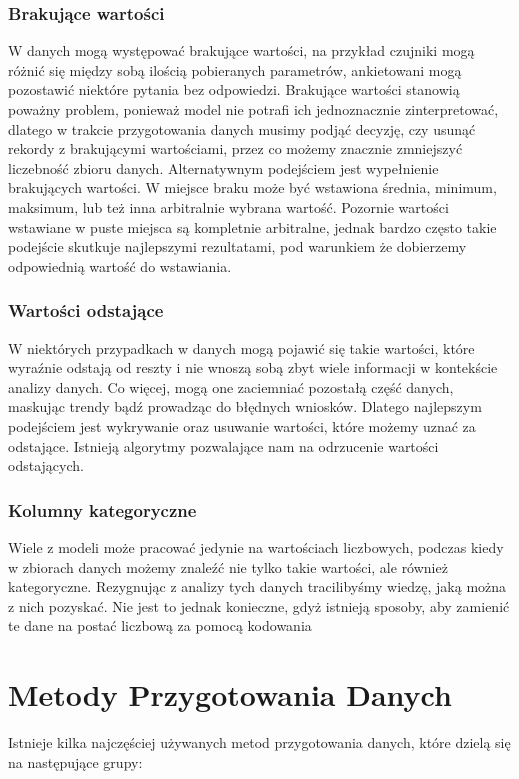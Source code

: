 \documentclass{book}
\begin{document}
\subsection{Brakujące wartości}
W danych mogą występować brakujące wartości, na przykład czujniki 
mogą różnić się między sobą ilością pobieranych parametrów, 
ankietowani mogą pozostawić niektóre pytania bez odpowiedzi. 
Brakujące wartości stanowią poważny problem, ponieważ model nie 
potrafi ich jednoznacznie zinterpretować, dlatego w trakcie 
przygotowania danych musimy podjąć decyzję, czy usunąć rekordy z 
brakującymi wartościami, przez co możemy znacznie zmniejszyć 
liczebność zbioru danych. Alternatywnym podejściem jest wypełnienie 
brakujących wartości. W miejsce braku może być wstawiona średnia, 
minimum, maksimum, lub też inna arbitralnie wybrana wartość. 
Pozornie wartości wstawiane w puste miejsca są kompletnie arbitralne, 
jednak bardzo często takie podejście skutkuje najlepszymi rezultatami, 
pod warunkiem że dobierzemy odpowiednią wartość do wstawiania. \cite{missing_values}
\subsection{Wartości odstające}
W niektórych przypadkach w danych mogą pojawić się takie wartości, 
które wyraźnie odstają od reszty i nie wnoszą sobą zbyt wiele 
informacji w kontekście analizy danych. Co więcej, mogą one 
zaciemniać pozostałą część danych, maskując trendy bądź prowadząc 
do błędnych wniosków. Dlatego najlepszym podejściem jest wykrywanie 
oraz usuwanie wartości, które możemy uznać za odstające. 
Istnieją algorytmy pozwalające nam na odrzucenie wartości odstających. \cite{outlier_detection}
\subsection{Kolumny kategoryczne}
Wiele z modeli może pracować jedynie na wartościach liczbowych, 
podczas kiedy w zbiorach danych możemy znaleźć nie tylko takie wartości, 
ale również kategoryczne. Rezygnując z analizy tych danych tracilibyśmy 
wiedzę, jaką można z nich pozyskać. Nie jest to jednak konieczne, 
gdyż istnieją sposoby, aby zamienić te dane na postać liczbową za 
pomocą kodowania \cite{enconding}



\chapter{Metody Przygotowania Danych}
Istnieje kilka najczęściej używanych metod przygotowania danych, 
które dzielą się na następujące grupy:
\end{document}
